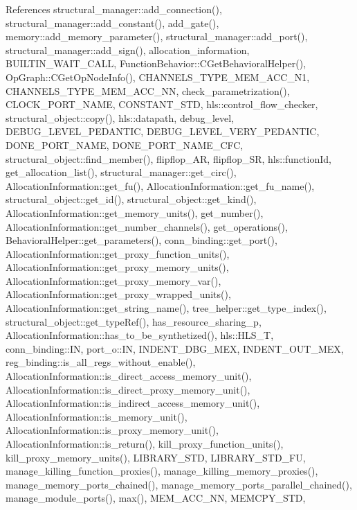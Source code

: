 References structural\+\_\+manager\+::add\+\_\+connection(), structural\+\_\+manager\+::add\+\_\+constant(), add\+\_\+gate(), memory\+::add\+\_\+memory\+\_\+parameter(), structural\+\_\+manager\+::add\+\_\+port(), structural\+\_\+manager\+::add\+\_\+sign(), allocation\+\_\+information, B\+U\+I\+L\+T\+I\+N\+\_\+\+W\+A\+I\+T\+\_\+\+C\+A\+LL, Function\+Behavior\+::\+C\+Get\+Behavioral\+Helper(), Op\+Graph\+::\+C\+Get\+Op\+Node\+Info(), C\+H\+A\+N\+N\+E\+L\+S\+\_\+\+T\+Y\+P\+E\+\_\+\+M\+E\+M\+\_\+\+A\+C\+C\+\_\+\+N1, C\+H\+A\+N\+N\+E\+L\+S\+\_\+\+T\+Y\+P\+E\+\_\+\+M\+E\+M\+\_\+\+A\+C\+C\+\_\+\+NN, check\+\_\+parametrization(), C\+L\+O\+C\+K\+\_\+\+P\+O\+R\+T\+\_\+\+N\+A\+ME, C\+O\+N\+S\+T\+A\+N\+T\+\_\+\+S\+TD, hls\+::control\+\_\+flow\+\_\+checker, structural\+\_\+object\+::copy(), hls\+::datapath, debug\+\_\+level, D\+E\+B\+U\+G\+\_\+\+L\+E\+V\+E\+L\+\_\+\+P\+E\+D\+A\+N\+T\+IC, D\+E\+B\+U\+G\+\_\+\+L\+E\+V\+E\+L\+\_\+\+V\+E\+R\+Y\+\_\+\+P\+E\+D\+A\+N\+T\+IC, D\+O\+N\+E\+\_\+\+P\+O\+R\+T\+\_\+\+N\+A\+ME, D\+O\+N\+E\+\_\+\+P\+O\+R\+T\+\_\+\+N\+A\+M\+E\+\_\+\+C\+FC, structural\+\_\+object\+::find\+\_\+member(), flipflop\+\_\+\+AR, flipflop\+\_\+\+SR, hls\+::function\+Id, get\+\_\+allocation\+\_\+list(), structural\+\_\+manager\+::get\+\_\+circ(), Allocation\+Information\+::get\+\_\+fu(), Allocation\+Information\+::get\+\_\+fu\+\_\+name(), structural\+\_\+object\+::get\+\_\+id(), structural\+\_\+object\+::get\+\_\+kind(), Allocation\+Information\+::get\+\_\+memory\+\_\+units(), get\+\_\+number(), Allocation\+Information\+::get\+\_\+number\+\_\+channels(), get\+\_\+operations(), Behavioral\+Helper\+::get\+\_\+parameters(), conn\+\_\+binding\+::get\+\_\+port(), Allocation\+Information\+::get\+\_\+proxy\+\_\+function\+\_\+units(), Allocation\+Information\+::get\+\_\+proxy\+\_\+memory\+\_\+units(), Allocation\+Information\+::get\+\_\+proxy\+\_\+memory\+\_\+var(), Allocation\+Information\+::get\+\_\+proxy\+\_\+wrapped\+\_\+units(), Allocation\+Information\+::get\+\_\+string\+\_\+name(), tree\+\_\+helper\+::get\+\_\+type\+\_\+index(), structural\+\_\+object\+::get\+\_\+type\+Ref(), has\+\_\+resource\+\_\+sharing\+\_\+p, Allocation\+Information\+::has\+\_\+to\+\_\+be\+\_\+synthetized(), hls\+::\+H\+L\+S\+\_\+T, conn\+\_\+binding\+::\+IN, port\+\_\+o\+::\+IN, I\+N\+D\+E\+N\+T\+\_\+\+D\+B\+G\+\_\+\+M\+EX, I\+N\+D\+E\+N\+T\+\_\+\+O\+U\+T\+\_\+\+M\+EX, reg\+\_\+binding\+::is\+\_\+all\+\_\+regs\+\_\+without\+\_\+enable(), Allocation\+Information\+::is\+\_\+direct\+\_\+access\+\_\+memory\+\_\+unit(), Allocation\+Information\+::is\+\_\+direct\+\_\+proxy\+\_\+memory\+\_\+unit(), Allocation\+Information\+::is\+\_\+indirect\+\_\+access\+\_\+memory\+\_\+unit(), Allocation\+Information\+::is\+\_\+memory\+\_\+unit(), Allocation\+Information\+::is\+\_\+proxy\+\_\+memory\+\_\+unit(), Allocation\+Information\+::is\+\_\+return(), kill\+\_\+proxy\+\_\+function\+\_\+units(), kill\+\_\+proxy\+\_\+memory\+\_\+units(), L\+I\+B\+R\+A\+R\+Y\+\_\+\+S\+TD, L\+I\+B\+R\+A\+R\+Y\+\_\+\+S\+T\+D\+\_\+\+FU, manage\+\_\+killing\+\_\+function\+\_\+proxies(), manage\+\_\+killing\+\_\+memory\+\_\+proxies(), manage\+\_\+memory\+\_\+ports\+\_\+chained(), manage\+\_\+memory\+\_\+ports\+\_\+parallel\+\_\+chained(), manage\+\_\+module\+\_\+ports(), max(), M\+E\+M\+\_\+\+A\+C\+C\+\_\+\+NN, M\+E\+M\+C\+P\+Y\+\_\+\+S\+TD, 
